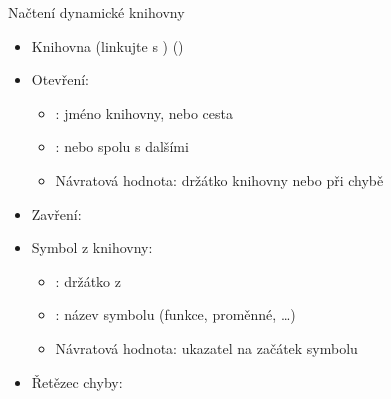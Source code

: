 \begin{frame}{Načtení dynamické knihovny}

  \begin{itemize}
    \item Knihovna  (linkujte s ) ()

    \pause

    \item Otevření: 
    \begin{itemize}
      \item {}: jméno knihovny, nebo cesta
      \item {}:  nebo  spolu s
        dalšími
      \item Návratová hodnota: držátko knihovny nebo  při chybě
    \end{itemize}

    \pause

    \item Zavření: 

    \pause

    \item Symbol z knihovny: 
    \begin{itemize}
      \item {}: držátko z 
      \item {}: název symbolu (funkce, proměnné, \dots)
      \item Návratová hodnota: ukazatel na začátek symbolu
    \end{itemize}

    \pause

    \item Řetězec chyby: 
  \end{itemize}

\end{frame}

